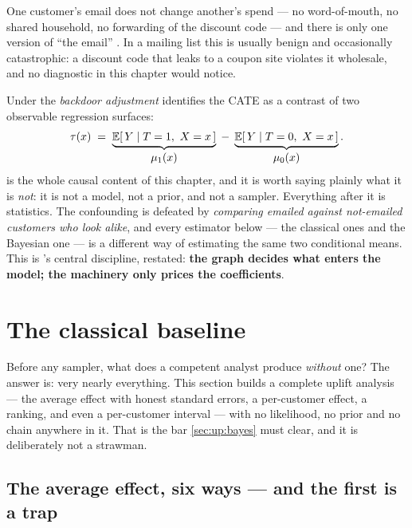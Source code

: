 \begin{assumption}[SUTVA]\label{as:up:sutva}
One customer's email does not change another's spend --- no word-of-mouth, no shared household,
no forwarding of the discount code --- and there is only one version of ``the email''
\citep{rubin1980, imbens2015}. In a mailing list this is usually benign and occasionally
catastrophic: a discount code that leaks to a coupon site violates it wholesale, and no
diagnostic in this chapter would notice.
\end{assumption}

Under  the \emph{backdoor adjustment} \citep{pearl2009}
identifies the CATE as a contrast of two observable regression surfaces:
%
\begin{equation}
  \tau(x) \;=\; \underbrace{\operatorname{\mathbb{E}}[\,Y \mid T = 1,\ X = x\,]}_{\textstyle \mu_1(x)}
             \;-\; \underbrace{\operatorname{\mathbb{E}}[\,Y \mid T = 0,\ X = x\,]}_{\textstyle \mu_0(x)} .
  \label{eq:up:backdoor}
\end{equation}
%
 is the whole causal content of this chapter, and it is worth saying plainly
what it is \emph{not}: it is not a model, not a prior, and not a sampler. Everything after it is
statistics. The confounding is defeated by \emph{comparing emailed against not-emailed customers
who look alike}, and every estimator below --- the classical ones and the Bayesian one --- is a
different way of estimating the same two conditional means. This is 's central
discipline, restated: \textbf{the graph decides what enters the model; the machinery only prices
the coefficients}.

\section{The classical baseline}
\label{sec:up:classical}

Before any sampler, what does a competent analyst produce \emph{without} one? The answer is: very
nearly everything. This section builds a complete uplift analysis --- the average effect with
honest standard errors, a per-customer effect, a ranking, and even a per-customer interval ---
with no likelihood, no prior and no chain anywhere in it. That is the bar \cref{sec:up:bayes}
must clear, and it is deliberately not a strawman.

\subsection*{The average effect, six ways --- and the first is a trap}

